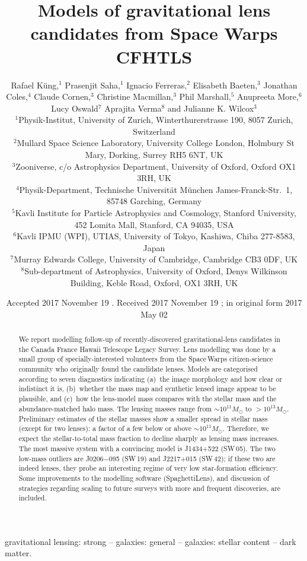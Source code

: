 \documentclass[fleqn,usenatbib]{template/mnras}
\title[Lens models for Space Warps CFHTLS]{Models of gravitational
    lens candidates from Space Warps CFHTLS}
\author[K\"ung et al]{Rafael K\"ung,$^{1}$
Prasenjit Saha,$^{1}$
Ignacio Ferreras,$^{2}$
Elisabeth Baeten,$^{3}$
\newauthor
Jonathan Coles,$^{4}$
Claude Cornen,$^{3}$
Christine Macmillan,$^{3}$
Phil Marshall,$^{5}$ 
\newauthor
Anupreeta More,$^{6}$
Lucy Oswald$^{7}$
Aprajita Verma$^{8}$
and Julianne K. Wilcox$^{3}$
%
\\
%
$^{1}$Physik-Institut, University of Zurich, Winterthurerstrasse 190, 8057 Zurich, Switzerland\\
$^{2}$Mullard Space Science Laboratory, University College London, Holmbury St Mary, Dorking, Surrey RH5 6NT, UK\\
$^{3}$Zooniverse, c/o Astrophysics Department, University of Oxford, Oxford OX1 3RH, UK \\
$^{4}$Physik-Department, Technische Universit\"at M\"unchen
James-Franck-Str.~1, 85748 Garching, Germany\\
$^{5}$Kavli Institute for Particle Astrophysics and Cosmology, Stanford University, 452 Lomita Mall, Stanford, CA 94035, USA\\
$^{6}$Kavli IPMU (WPI), UTIAS, University of Tokyo, Kashiwa, Chiba 277-8583, Japan\\
$^{7}$Murray Edwards College, University of Cambridge, Cambridge CB3 0DF, UK\\
$^{8}$Sub-department of Astrophysics, University of Oxford, Denys Wilkinson Building, Keble Road, Oxford, OX1 3RH, UK\\
}
\date{Accepted 2017 November 19 . Received 2017 November 19 ; in original form 2017 May 02}
\newcommand{\SW}{Space\,Warps\xspace}
\newcommand{\sw}[1]{SW\,#1\xspace}
\begin{document}
\label{firstpage}
\pagerange{\pageref{firstpage}--\pageref{lastpage}}
\maketitle

\begin{abstract}
We report modelling follow-up of recently-discovered
gravitational-lens candidates in the Canada France Hawaii Telescope
Legacy Survey. Lens modelling was done by a small group of
specially-interested volunteers from the \SW citizen-science community
who originally found the candidate lenses.  Models are categorised
according to seven diagnostics indicating (a)~the image morphology and
how clear or indistinct it is, (b)~whether the mass map and synthetic
lensed image appear to be plausible, and (c)~how the lens-model mass
compares with the stellar mass and the abundance-matched halo mass.
The lensing masses range from $\sim10^{11}M_\odot$ to
$>10^{13}M_\odot$. Preliminary estimates of the stellar masses show a
smaller spread in stellar mass (except for two lenses): a factor of a
few below or above $\sim10^{11}M_\odot$.  Therefore, we expect the
stellar-to-total mass fraction to decline sharply as lensing mass
increases.  The most massive system with a convincing model is
J1434+522 (\sw{05}).  The two low-mass outliers are J0206$-$095
(\sw{19}) and J2217+015 (\sw{42}); if these two are indeed lenses,
they probe an interesting regime of very low star-formation
efficiency.  Some improvements to the modelling software
(SpaghettiLens), and discussion of strategies regarding scaling to
future surveys with more and frequent discoveries, are included.
\end{abstract}

\begin{keywords}
gravitational lensing: strong -- galaxies: general
-- galaxies: stellar content -- dark matter.
\end{keywords}















\clearpage



\clearpage

\appendix




\bsp	%
\label{lastpage}
\end{document}
